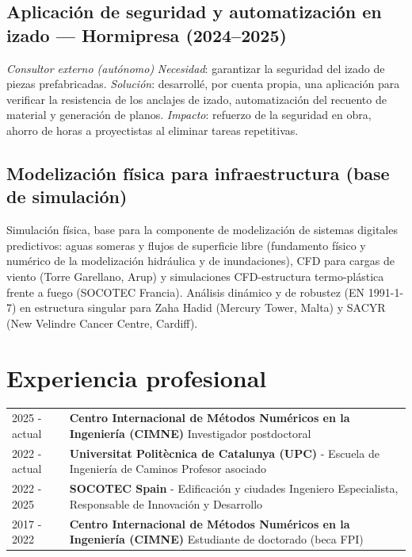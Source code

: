 \documentclass[11pt]{article}
\begin{document}
\subsection{Aplicación de seguridad y automatización en izado --- Hormipresa (2024--2025)}
\parbox{\linewidth}{
    \emph{Consultor externo (autónomo)} \newline
    \emph{Necesidad}: garantizar la seguridad del izado de piezas prefabricadas. \newline
    \emph{Solución}: desarrollé, por cuenta propia, una aplicación para verificar la resistencia de los anclajes de izado, automatización del recuento de material y generación de planos. \newline
    \emph{Impacto}: refuerzo de la seguridad en obra, ahorro de horas a proyectistas al eliminar tareas repetitivas.}

\subsection{Modelización física para infraestructura (base de simulación)}
\parbox{\linewidth}{
    Simulación física, base para la componente de modelización de sistemas digitales predictivos: aguas someras y flujos de superficie libre (fundamento físico y numérico de la modelización hidráulica y de inundaciones), CFD para cargas de viento (Torre Garellano, Arup) y simulaciones CFD-estructura termo-plástica frente a fuego (SOCOTEC Francia). Análisis dinámico y de robustez (EN 1991-1-7) en estructura singular para Zaha Hadid (Mercury Tower, Malta) y SACYR (New Velindre Cancer Centre, Cardiff).}


\section{Experiencia profesional}
\begin{tabularx}{\linewidth}{lX}
    2025 - actual &
    \textbf{Centro Internacional de Métodos Numéricos en la Ingeniería (CIMNE)} \newline
    Investigador postdoctoral \\

    2022 - actual &
    \textbf{Universitat Politècnica de Catalunya (UPC)} - Escuela de Ingeniería de Caminos \newline
    Profesor asociado \\

    2022 - 2025 &
    \textbf{SOCOTEC Spain} - Edificación y ciudades \newline
    Ingeniero Especialista, Responsable de Innovación y Desarrollo \\

    2017 - 2022 &
    \textbf{Centro Internacional de Métodos Numéricos en la Ingeniería (CIMNE)} \newline
    Estudiante de doctorado (beca FPI) \\
\end{tabularx}
\end{document}
